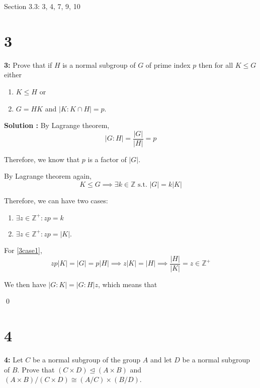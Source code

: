 \documentclass[11pt]{article}
\newcommand{\Z}{\mathbb{Z}}
\newenvironment{exercise}[1]
	{\noindent \textbf{#1:}}
	{\par \vspace{0.5\baselineskip}}
\newenvironment{solution}[1][\unskip]
	{\noindent \textbf{Solution #1:} }
	{\qed \pagebreak}
\begin{document}


\begin{center}
\end{center}



Section 3.3: 3, 4, 7, 9, 10

\section*{3}

\begin{exercise}{3}
	Prove that if $H$ is a normal subgroup of $G$ of prime index $p$ then for all $K \le G$ either
	\begin{enumerate}
		\item $K\leqslant H$ or
		\item $G=HK$ and $|K:K \cap H| = p$.
	\end{enumerate}
\end{exercise}

\begin{solution}
	By Lagrange theorem,
	\[
		|G:H| = \frac{|G|}{|H|} = p
	\]

	Therefore, we know that $p$ is a factor of $|G|$.

	By Lagrange theorem again,
	\[
		K \le G \implies \exists k \in \Z \text{ s.t. } |G| = k|K|
	\]

	Therefore, we can have two cases:

	\begin{enumerate}
		\item $\exists z \in \Z^+ : zp = k$	 \label{3case1}
		\item $\exists z \in \Z^+ : zp = |K|$. \label{3case2}
	\end{enumerate}

	For \ref{3case1},
	\[
		zp|K|=|G|=p|H| \implies z|K| = |H| \implies \frac{|H|}{|K|} = z \in \Z^+
	\]

	We then have $|G:K| = |G:H|z$, which means that $     $
	


\end{solution}

\section*{4}

\begin{exercise}{4}
	Let $C$	be a normal subgroup of the group $A$ and let $D$ be a normal subgroup of $B$.
	Prove that $(C \times D) \trianglelefteq (A \times B)$ and
	$(A \times B) / (C \times D) \cong (A / C) \times (B / D)$.
\end{exercise}
\end{document}

